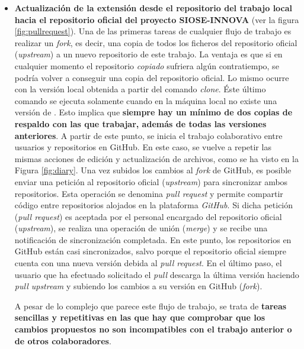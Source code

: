 \begin{itemize}
\item \textbf{Actualización de la extensión desde el repositorio del trabajo local hacia el repositorio oficial del proyecto SIOSE-INNOVA} (ver la figura \ref{fig:pullrequest}). Una de las primeras tareas de cualquier flujo de trabajo es realizar un \textit{fork}, es decir, una copia de todos los ficheros del repositorio oficial (\textit{upstream}) a un nuevo repositorio de este trabajo. La ventaja es que si en cualquier momento el repositorio \textit{copiado} sufriera algún contratiempo, se podría volver a conseguir una copia del repositorio oficial. Lo mismo ocurre con la versión local obtenida a partir del comando \textit{clone}. Éste último comando se ejecuta solamente cuando en la máquina local no existe una versión de \pgland{}. Esto implica que \textbf{siempre hay un mínimo de dos copias de respaldo con las que trabajar, además de todas las versiones anteriores}. A partir de este punto, se inicia el trabajo colaborativo entre usuarios y repositorios en GitHub. En este caso, se vuelve a repetir las mismas acciones de edición y actualización de archivos, como se ha visto en la Figura \ref{fig:diary}. Una vez subidos los cambios al \textit{fork} de GitHub, es posible enviar una petición al repositorio oficial (\textit{upstream}) para sincronizar ambos repositorios. Esta operación se denomina \textit{pull request} y permite compartir código entre repositorios alojados en la plataforma \textit{GitHub}. Si dicha petición (\textit{pull request}) es aceptada por el personal encargado del repositorio oficial (\textit{upstream}), se realiza una operación de unión (\textit{merge}) y se recibe una notificación de sincronización completada. En este punto, los repositorios en GitHub están casi sincronizados, salvo porque el repositorio oficial siempre cuenta con una nueva versión debida al \textit{pull request}. En el último paso, el usuario que ha efectuado solicitado el \textit{pull} descarga la última versión haciendo \textit{pull upstream} y subiendo los cambios a su versión en GitHub (\textit{fork}).

A pesar de lo complejo que parece este flujo de trabajo, se trata de \textbf{tareas sencillas y repetitivas en las que hay que comprobar que los cambios propuestos no son incompatibles con el trabajo anterior o de otros colaboradores}.


\end{itemize}
